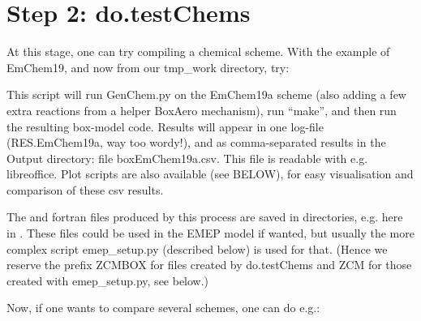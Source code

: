\documentclass[a4paper,10pt,english]{sphinxmanual}
\begin{document}
\begin{sphinxVerbatim}[commandchars=\\\{\}]
 
 
\end{sphinxVerbatim}


\section{Step 2: do.testChems}
\label{\detokenize{GenChemDoc_quickstart:step-2-do-testchems}}
At this stage, one can try compiling a chemical scheme. With the example of
EmChem19, and now from our tmp\_work directory, try:

\begin{sphinxVerbatim}[commandchars=\\\{\}]
  
\end{sphinxVerbatim}

This script will run GenChem.py on the EmChem19a scheme (also adding
a few extra reactions from a helper BoxAero mechanism), run “make”, and then
run the resulting box-model code. Results will appear in
one log-file (RES.EmChem19a, way too wordy!), and as comma-separated
results in the Output directory:  file boxEmChem19a.csv.
This file is readable with e.g. libreoffice. Plot scripts are
also available (see BELOW), for easy visualisation and
comparison of these csv results.

The  and  fortran files produced by this process are saved in directories, e.g.
here in  . These files could be used in the EMEP model if wanted,
but usually the more complex script emep\_setup.py (described below) is
used for that. (Hence we reserve the prefix ZCMBOX for files created by do.testChems
and ZCM for those created with emep\_setup.py, see below.)

Now, if one wants to compare several schemes, one can do e.g.:

\begin{sphinxVerbatim}[commandchars=\\\{\}]
    
\end{sphinxVerbatim}
\end{document}
